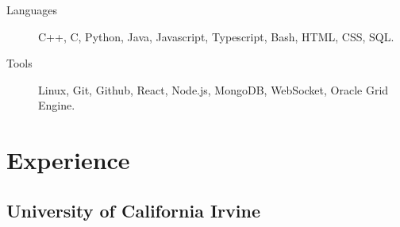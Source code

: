 \documentclass[letterpaper,10pt,oneside]{article}
\begin{document}
\begin{description}
\item[Languages]\quad C++, C, Python, Java, Javascript, Typescript, Bash, HTML, CSS, SQL.
\item[Tools]\quad Linux, Git, Github, React, Node.js, MongoDB, WebSocket, Oracle Grid Engine.
\end{description}
\vspace{-7px}
\section*{Experience}
\subsection*{University of California Irvine}
\vspace{-3px}
\end{document}
